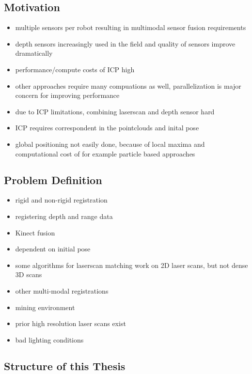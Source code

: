 \subsection{Motivation}

\begin{itemize}
    \item multiple sensors per robot resulting in multimodal sensor fusion requirements
    \item depth sensors increasingly used in the field and quality of sensors improve dramatically
    \item performance/compute costs of ICP high
    \item other approaches require many compuations as well, parallelization is major concern for improving performance
    \item due to ICP limitations, combining laserscan and depth sensor hard
    \item ICP requires correspondent in the pointclouds and inital pose
    \item global positioning not easily done, because of local maxima and computational cost of for example particle based approaches
\end{itemize}

\subsection{Problem Definition}

\begin{itemize}
    \item rigid and non-rigid registration
    \item registering depth and range data
    \item Kinect fusion
    \item dependent on initial pose
    \item some algorithms for laserscan matching work on 2D laser scans, but not dense 3D scans
    \item other multi-modal registrations
    \item mining environment
    \item prior high resolution laser scans exist
    \item bad lighting conditions
\end{itemize}

\subsection{Structure of this Thesis}
